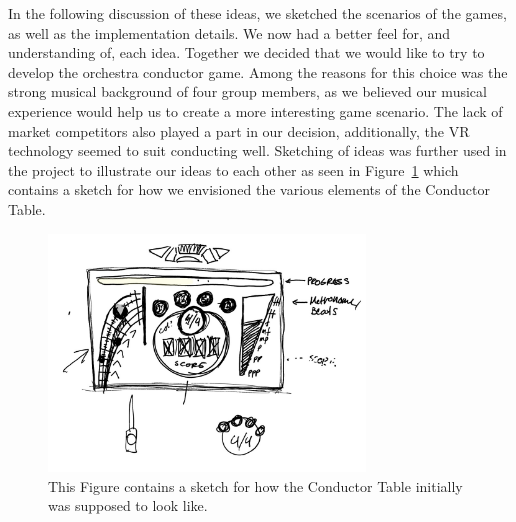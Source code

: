 In the following discussion of these ideas, we sketched the scenarios of the games, as well as the implementation details. We now had a better feel for, and understanding of, each idea. Together we decided that we would like to try to develop the orchestra conductor game. Among the reasons for this choice was the strong musical background of four group members, as we believed our musical experience would help us to create a more interesting game scenario. The lack of market competitors also played a part in our decision, additionally, the VR technology seemed to suit conducting well. Sketching of ideas was further used in the project to illustrate our ideas to each other as seen in Figure~\ref{fig:tablesketch} which contains a sketch for how we envisioned the various elements of the Conductor Table. 

\begin{figure}[tbph]
    \centering
    \includegraphics[width=0.75\textwidth]{images/sketch.jpg}
    \caption[Example sketch of the Conductor Table]{This Figure contains a sketch for how the Conductor Table initially was supposed to look like.}
    \label{fig:tablesketch}
\end{figure}

